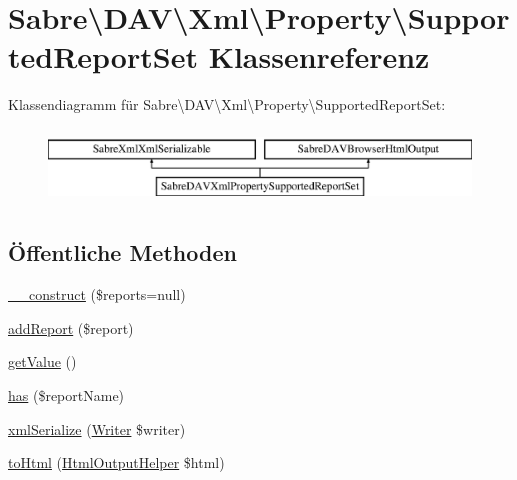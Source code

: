 \hypertarget{class_sabre_1_1_d_a_v_1_1_xml_1_1_property_1_1_supported_report_set}{}\section{Sabre\textbackslash{}D\+AV\textbackslash{}Xml\textbackslash{}Property\textbackslash{}Supported\+Report\+Set Klassenreferenz}
\label{class_sabre_1_1_d_a_v_1_1_xml_1_1_property_1_1_supported_report_set}
Klassendiagramm für Sabre\textbackslash{}D\+AV\textbackslash{}Xml\textbackslash{}Property\textbackslash{}Supported\+Report\+Set\+:\begin{figure}[H]
\begin{center}
\leavevmode
\includegraphics[height=2.000000cm]{class_sabre_1_1_d_a_v_1_1_xml_1_1_property_1_1_supported_report_set}
\end{center}
\end{figure}
\subsection*{Öffentliche Methoden}
\begin{DoxyCompactItemize}
\item 
\mbox{\hyperlink{class_sabre_1_1_d_a_v_1_1_xml_1_1_property_1_1_supported_report_set_ad9bafafe7287d6567afd8f1bb531fc4e}{\+\_\+\+\_\+construct}} (\$reports=null)
\item 
\mbox{\hyperlink{class_sabre_1_1_d_a_v_1_1_xml_1_1_property_1_1_supported_report_set_aaf8f8f745c03e09a211e16ce6e3f1176}{add\+Report}} (\$report)
\item 
\mbox{\hyperlink{class_sabre_1_1_d_a_v_1_1_xml_1_1_property_1_1_supported_report_set_a4e3e10bc490326c5f00e6d7aa1d34866}{get\+Value}} ()
\item 
\mbox{\hyperlink{class_sabre_1_1_d_a_v_1_1_xml_1_1_property_1_1_supported_report_set_aa21a8933d7341c529dece848aa36c3b4}{has}} (\$report\+Name)
\item 
\mbox{\hyperlink{class_sabre_1_1_d_a_v_1_1_xml_1_1_property_1_1_supported_report_set_ae9986a7b7f6f9f08983bc740f6e1b357}{xml\+Serialize}} (\mbox{\hyperlink{class_sabre_1_1_xml_1_1_writer}{Writer}} \$writer)
\item 
\mbox{\hyperlink{class_sabre_1_1_d_a_v_1_1_xml_1_1_property_1_1_supported_report_set_a3775a63feb6a3353e4f00bea05f66fad}{to\+Html}} (\mbox{\hyperlink{class_sabre_1_1_d_a_v_1_1_browser_1_1_html_output_helper}{Html\+Output\+Helper}} \$html)
\end{DoxyCompactItemize}
